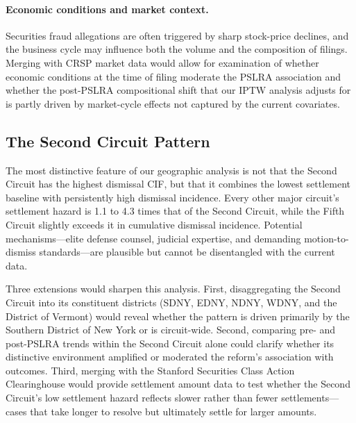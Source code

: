 \paragraph{Economic conditions and market context.}
Securities fraud allegations are often triggered by sharp
stock-price declines, and the business cycle may influence
both the volume and the composition of filings. Merging with
CRSP market data would allow for examination of whether
economic conditions at the time of filing moderate the PSLRA
association and whether the post-PSLRA compositional shift
that our IPTW analysis adjusts for is partly driven by
market-cycle effects not captured by the current covariates.

\subsection{The Second Circuit Pattern}

The most distinctive feature of our geographic analysis is not that the
Second Circuit has the highest dismissal CIF, but that it combines the
lowest settlement baseline with persistently high dismissal incidence.
Every other major circuit's settlement hazard is 1.1 to 4.3 times that of
the Second Circuit, while the Fifth Circuit slightly exceeds it in
cumulative dismissal incidence. Potential mechanisms---elite defense
counsel, judicial expertise, and demanding motion-to-dismiss
standards---are plausible but cannot be disentangled with the current data.

Three extensions would sharpen this analysis. First,
disaggregating the Second Circuit into its constituent
districts (SDNY, EDNY, NDNY, WDNY, and the District of
Vermont) would reveal whether the pattern is driven primarily
by the Southern District of New York or is circuit-wide.
Second, comparing pre- and post-PSLRA trends within the
Second Circuit alone could clarify whether its distinctive
environment amplified or moderated the reform's association
with outcomes. Third, merging with the Stanford Securities
Class Action Clearinghouse would provide settlement amount
data to test whether the Second Circuit's low settlement
hazard reflects slower rather than fewer settlements---cases
that take longer to resolve but ultimately settle for larger
amounts. 

